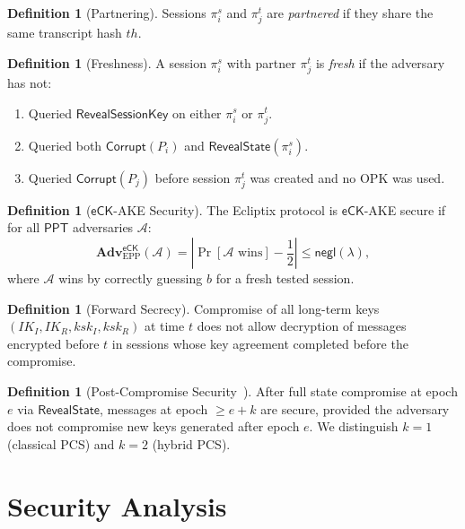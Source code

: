 \documentclass[11pt,a4paper]{article}
\theoremstyle{definition}
\newtheorem{definition}[theorem]{Definition}
\newcommand{\secpar}{\lambda}
\newcommand{\negl}{\mathsf{negl}}
\newcommand{\ppt}{\mathsf{PPT}}
\newcommand{\adv}{\mathbf{Adv}}
\newcommand{\advA}{\mathcal{A}}
\newcommand{\eCK}{\textsf{eCK}}
\newcommand{\IK}{\mathit{IK}}
\begin{document}
\begin{definition}[Partnering]
Sessions $\pi_i^s$ and $\pi_j^t$ are \emph{partnered} if they share the same transcript hash $\mathit{th}$.
\end{definition}

\begin{definition}[Freshness]\label{def:freshness}
A session $\pi_i^s$ with partner $\pi_j^t$ is \emph{fresh} if the adversary has not:
\begin{enumerate}
  \item Queried $\textsf{RevealSessionKey}$ on either $\pi_i^s$ or $\pi_j^t$.
  \item Queried both $\textsf{Corrupt}(P_i)$ and $\textsf{RevealState}(\pi_i^s)$.
  \item Queried $\textsf{Corrupt}(P_j)$ before session $\pi_j^t$ was created and no OPK was used.
\end{enumerate}
\end{definition}

\begin{definition}[$\eCK$-AKE Security]\label{def:ake}
The Ecliptix protocol is $\eCK$-AKE secure if for all $\ppt$ adversaries $\advA$:
\[
  \adv^{\eCK}_{\mathrm{EPP}}(\advA) = \left|\Pr[\advA \text{ wins}] - \frac{1}{2}\right| \leq \negl(\secpar),
\]
where $\advA$ wins by correctly guessing $b$ for a fresh tested session.
\end{definition}

\begin{definition}[Forward Secrecy]\label{def:fs}
Compromise of all long-term keys $(\IK_I, \IK_R, ksk_I, ksk_R)$ at time $t$ does not allow decryption of messages encrypted before $t$ in sessions whose key agreement completed before the compromise.
\end{definition}

\begin{definition}[Post-Compromise Security~\cite{cohn-gordon2020}]\label{def:pcs}
After full state compromise at epoch $e$ via $\textsf{RevealState}$, messages at epoch $\geq e + k$ are secure, provided the adversary does not compromise new keys generated after epoch $e$. We distinguish $k = 1$ (classical PCS) and $k = 2$ (hybrid PCS).
\end{definition}


\section{Security Analysis}\label{sec:proofs}
\end{document}

